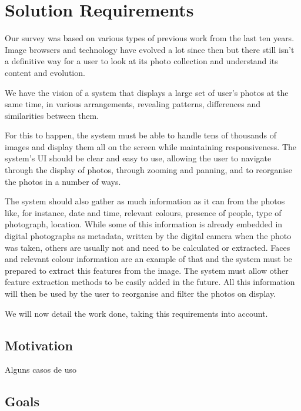 \chapter{Solution Requirements} %
\label{chapter:solution_requirements}


Our survey was based on various types of previous work from the last ten years. Image browsers and technology have evolved a lot since then but there still isn't a definitive way for a user to look at its photo collection and understand its content and evolution. 

We have the vision of a system that displays a large set of user’s photos at the same time, in various arrangements, revealing patterns, differences and similarities between them.

For this to happen, the system must be able to handle tens of thousands of images and display them all on the screen while maintaining responsiveness. The system's \ac{UI} should be clear and easy to use, allowing the user to navigate through the display of photos, through zooming and panning, and to reorganise the photos in a number of ways.

The system should also gather as much information as it can from the photos like, for instance, date and time, relevant colours, presence of people, type of photograph, location. While some of this information is already embedded in digital photographs as metadata, written by the digital camera when the photo was taken, others are usually not and need to be calculated or extracted. Faces and relevant colour information are an example of that and the system must be prepared to extract this features from the image. The system must allow other feature extraction methods to be easily added in the future. All this information will then be used by the user to reorganise and filter the photos on display.


We will now detail the work done, taking this requirements into account.

\section{Motivation} %
\label{sec:motivation}

Alguns casos de uso


\section{Goals} %
\label{sec:goals}

